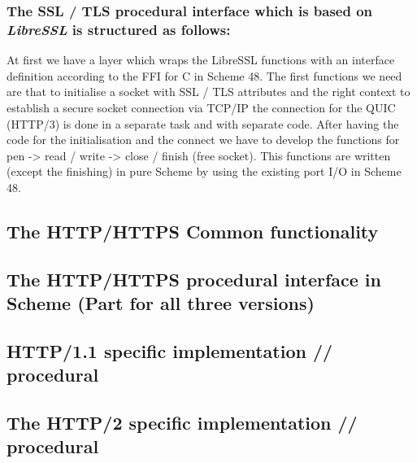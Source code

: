 \documentclass[10pt,a4paper,english]{article}
\newcommand{\code}[1]{{\tt{#1}}}
\newcommand{\abbrhighcol}[1]{\textbf{\textit{#1}}}
\begin{document}
\begin{multicols}{2}
\subsubsection{The SSL / TLS procedural interface which is based on \abbrhighcol{LibreSSL} is structured as follows:}
\begin{flushleft}
At first we have a layer which wraps the LibreSSL functions with an interface definition according to the FFI for C in Scheme 48.  \newline The first functions we need are that to initialise a socket with SSL / TLS attributes and the right context to establish a secure socket connection via TCP/IP the connection for the QUIC (HTTP/3) is done in a separate task and with separate code.  \newline After having the code for the initialisation and the connect we have to develop the functions for \newline \code open -> read / write -> close / finish (free socket). \newline This functions are written (except the finishing) in pure Scheme by using the existing port I/O in Scheme 48.

\end{flushleft}
\subsection{The HTTP/HTTPS Common functionality}
\begin{flushleft}
\end{flushleft}
\subsection{The HTTP/HTTPS procedural interface in  Scheme (Part for all three versions)}
\begin{flushleft}
\end{flushleft}
\subsection{HTTP/1.1 specific implementation // procedural}
\begin{flushleft}
\end{flushleft}
\subsection{The HTTP/2 specific implementation // procedural}
\begin{flushleft}
\end{flushleft}

\end{multicols}
\end{document}
